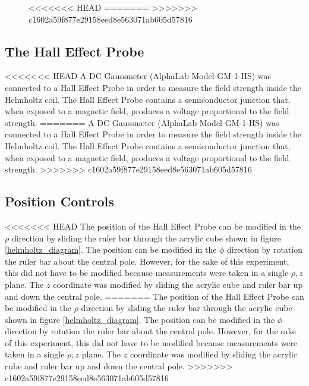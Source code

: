 \documentclass[a4paper]{article}
\begin{document}
\begin{figure}[h]
\centering
<<<<<<< HEAD
=======
>>>>>>> c1602a59f877e29158eed8e563071ab605d57816
\label{helmholtz_circuit}
\end{figure}

\subsection{The Hall Effect Probe}

<<<<<<< HEAD
A DC Gaussmeter (AlphaLab Model GM-1-HS) was connected to a Hall
Effect Probe in order to measure the field strength inside the
Helmholtz coil. The Hall Effect Probe contains a semiconductor
junction that, when exposed to a magnetic field, produces a voltage
proportional to the field strength.
=======
\qq A DC Gaussmeter (AlphaLab Model GM-1-HS) was connected to a Hall Effect Probe in
order to measure the field strength inside the Helmholtz coil. The Hall Effect
Probe contains a semiconductor junction that, when exposed to a magnetic field,
produces a voltage proportional to the field strength.
>>>>>>> c1602a59f877e29158eed8e563071ab605d57816

\subsection{Position Controls}

<<<<<<< HEAD
The position of the Hall Effect Probe can be modified in the $\rho$
direction by sliding the ruler bar through the acrylic cube shown in
figure \ref{helmholtz_diagram}. The position can be modified in the
$\phi$ direction by rotation the ruler bar about the central
pole. However, for the sake of this experiment, this did not have to
be modified because measurements were taken in a single $\rho , z$
plane. The $z$ coordinate was modified by sliding the acrylic cube and
ruler bar up and down the central pole.
=======
\qq The position of the Hall Effect Probe can be modified in the $\rho$ direction by
sliding the ruler bar through the acrylic cube shown in figure
\ref{helmholtz_diagram}. The position can be modified in the $\phi$ direction by
rotation the ruler bar about the central pole. However, for the sake of this
experiment, this did not have to be modified because measurements were taken in
a single $\rho , z$ plane. The $z$ coordinate was modified by sliding the
acrylic cube and ruler bar up and down the central pole.
>>>>>>> c1602a59f877e29158eed8e563071ab605d57816
\end{document}
